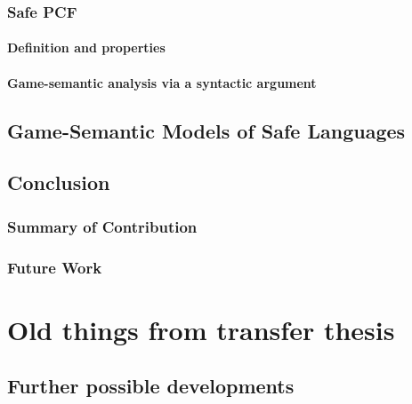    \section{Safe PCF}
        \subsection{Definition and properties}
        \subsection{Game-semantic analysis via a syntactic argument}

    


\chapter{Game-Semantic Models of Safe Languages}

    



\chapter{Conclusion}
    \section{Summary of Contribution}
    \section{Future Work}


\part{Old things from transfer thesis}




\chapter{Further possible developments}

